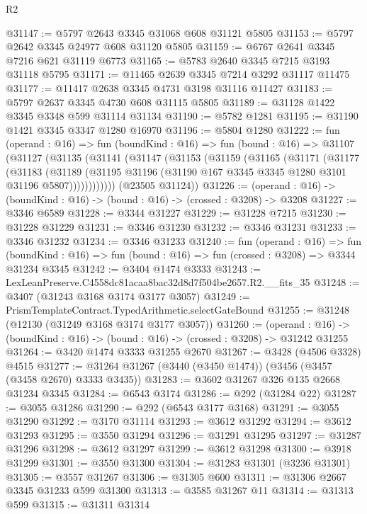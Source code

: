 \begin{lexlean}{R2}
\begin{coremodule}
@31147 := @5797 @2643 @3345 @31068 @608 @31121 @5805
@31153 := @5797 @2642 @3345 @24977 @608 @31120 @5805
@31159 := @6767 @2641 @3345 @7216 @621 @31119 @6773
@31165 := @5783 @2640 @3345 @7215 @3193 @31118 @5795
@31171 := @11465 @2639 @3345 @7214 @3292 @31117 @11475
@31177 := @11417 @2638 @3345 @4731 @3198 @31116 @11427
@31183 := @5797 @2637 @3345 @4730 @608 @31115 @5805
@31189 := @31128 @1422 @3345 @3348 @599 @31114 @31134
@31190 := @5782 @1281
@31195 := @31190 @1421 @3345 @3347 @1280 @16970
@31196 := @5804 @1280
@31222 := fun (operand : @16) =>
  fun (boundKind : @16) =>
  fun (bound : @16) =>
  @31107
    (@31127
      (@31135
        (@31141
          (@31147
            (@31153
              (@31159
                (@31165
                  (@31171
                    (@31177
                      (@31183
                        (@31189
                          (@31195
                            @31196
                            (@31190 @167 @3345 @3345 @1280 @3101 @31196 @5807))))))))))))
      (@23505 @31124))
@31226 := (operand : @16) -> (boundKind : @16) -> (bound : @16) -> (crossed : @3208) -> @3208
@31227 := @3346 @6589
@31228 := @3344 @31227
@31229 := @31228 @7215
@31230 := @31228 @31229
@31231 := @3346 @31230
@31232 := @3346 @31231
@31233 := @3346 @31232
@31234 := @3346 @31233
@31240 := fun (operand : @16) =>
  fun (boundKind : @16) => fun (bound : @16) => fun (crossed : @3208) => @3344 @31234 @3345
@31242 := @3404 @1474 @3333
@31243 := LexLeanPreserve.C4558dc81acaa8bac32d8d7f504be2657.R2.__fits_35
@31248 := @3407 (@31243 @3168 @3174 @3177 @3057)
@31249 := PrismTemplateContract.TypedArithmetic.selectGateBound
@31255 := @31248 (@12130 (@31249 @3168 @3174 @3177 @3057))
@31260 := (operand : @16) ->
  (boundKind : @16) -> (bound : @16) -> (crossed : @3208) -> @31242 @31255
@31264 := @3420 @1474 @3333 @31255 @2670
@31267 := @3428 (@4506 @3328) @4515
@31277 := @31264 @31267 (@3440 (@3450 @1474)) (@3456 (@3457 (@3458 @2670) @3333 @3435))
@31283 := @3602 @31267 @326 @135 @2668 @31234 @3345
@31284 := @6543 @3174
@31286 := @292 (@31284 @22)
@31287 := @3055 @31286
@31290 := @292 (@6543 @3177 @3168)
@31291 := @3055 @31290
@31292 := @3170 @31114
@31293 := @3612 @31292
@31294 := @3612 @31293
@31295 := @3550 @31294
@31296 := @31291 @31295
@31297 := @31287 @31296
@31298 := @3612 @31297
@31299 := @3612 @31298
@31300 := @3918 @31299
@31301 := @3550 @31300
@31304 := @31283 @31301 (@3236 @31301)
@31305 := @3557 @31267
@31306 := @31305 @600
@31311 := @31306 @2667 @3345 @31233 @599 @31300
@31313 := @3585 @31267 @11
@31314 := @31313 @599
@31315 := @31311 @31314

\end{coremodule}
\end{lexlean}
